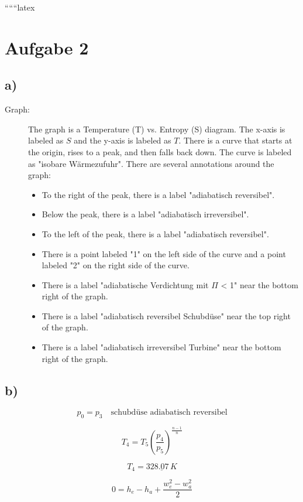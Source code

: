 
``````latex


\section*{Aufgabe 2}

\subsection*{a)}

\begin{description}
    \item[Graph:] The graph is a Temperature (T) vs. Entropy (S) diagram. The x-axis is labeled as $S$ and the y-axis is labeled as $T$. There is a curve that starts at the origin, rises to a peak, and then falls back down. The curve is labeled as "isobare Wärmezufuhr". There are several annotations around the graph:
    \begin{itemize}
        \item To the right of the peak, there is a label "adiabatisch reversibel".
        \item Below the peak, there is a label "adiabatisch irreversibel".
        \item To the left of the peak, there is a label "adiabatisch reversibel".
        \item There is a point labeled "1" on the left side of the curve and a point labeled "2" on the right side of the curve.
        \item There is a label "adiabatische Verdichtung mit $\Pi$ < 1" near the bottom right of the graph.
        \item There is a label "adiabatisch reversibel Schubdüse" near the top right of the graph.
        \item There is a label "adiabatisch irreversibel Turbine" near the bottom right of the graph.
    \end{itemize}
\end{description}

\subsection*{b)}

\[
p_0 = p_3 \quad \text{schubdüse adiabatisch reversibel}
\]

\[
T_4 = T_5 \left( \frac{p_4}{p_5} \right)^{\frac{n-1}{n}}
\]

\[
T_4 = \underline{328.07 \, K}
\]

\[
0 = h_e - h_a + \frac{w_e^2 - w_a^2}{2}
\]

